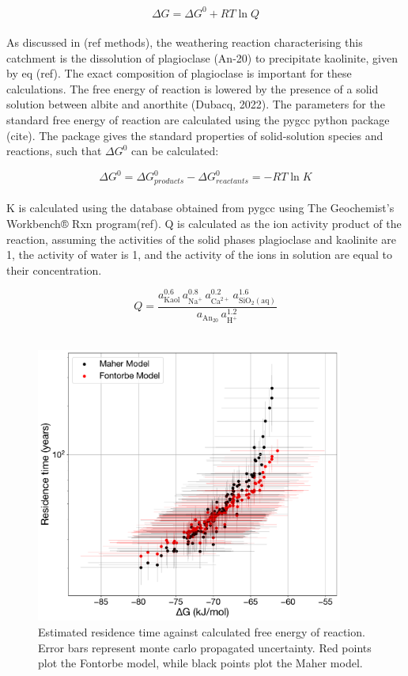 \begin{equation}
    \Delta G = \Delta G^0 + RT \ln Q
\end{equation}\\

As discussed in  (ref methods), the weathering reaction characterising this catchment is the dissolution of plagioclase (An-20) to precipitate kaolinite, given by eq (ref). The exact composition of plagioclase is important for these calculations. The free energy of reaction is lowered by the presence of a solid solution between albite and anorthite (Dubacq, 2022). The parameters for the standard free energy of reaction are calculated using the pygcc python package (cite). The package gives the standard properties of solid-solution species and reactions, such that $\Delta G^0$ can be calculated:

\begin{equation}
    \Delta G^0 = \Delta G^0_{products} - \Delta G^0_{reactants} = -RT \ln K
\end{equation}\\

K is calculated using the database obtained from pygcc using The Geochemist's Workbench® Rxn program(ref). Q is calculated as the ion activity product of the reaction, assuming the activities of the solid phases plagioclase and kaolinite are 1, the activity of water is 1, and the activity of the ions in solution are equal to their concentration.

\begin{equation}
    Q = \frac{a_{\mathrm{Kaol}}^{0.6}\,a_{\mathrm{Na}^{+}}^{0.8}\,a_{\mathrm{Ca}^{2+}}^{0.2}\,a_{\mathrm{SiO_{2}(aq)}}^{1.6}}
           {a_{\mathrm{An_{20}}}\,a_{\mathrm{H}^{+}}^{1.2}}
\end{equation}\\


\begin{figure}[H]
    \centering
    \includegraphics[width=0.9\textwidth]{DGMF.pdf}
    \caption{Estimated residence time against calculated free energy of reaction. Error bars represent monte carlo propagated uncertainty. Red points plot the Fontorbe model, while black points plot the Maher model.}
    \label{fig:deltag}
\end{figure}

